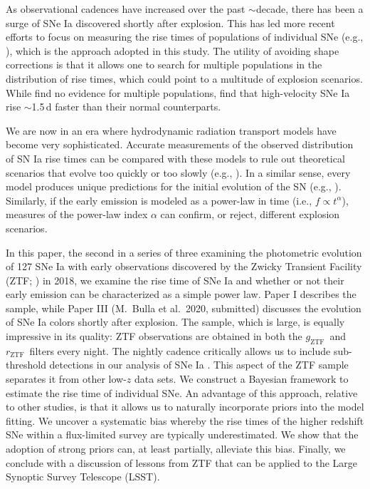 \documentclass[twocolumn]{./aastex63}
\newcommand{\rztf}{$r_\mathrm{ZTF}$}
\newcommand{\gztf}{$g_\mathrm{ZTF}$}
\begin{document}
As observational cadences have increased over the past $\sim$decade, there has
been a surge of SNe Ia discovered shortly after explosion. This has led more
recent efforts to focus on measuring the rise times of populations of
individual SNe (e.g., \citealt{Firth15,Zheng17a,Papadogiannakis19}), which is
the approach adopted in this study. The utility of avoiding shape corrections
is that it allows one to search for multiple populations in the distribution
of rise times, which could point to a multitude of explosion scenarios. While
\citet{Papadogiannakis19} find no evidence for multiple populations,
\citet{Ganeshalingam10} find that high-velocity SNe Ia rise $\sim$1.5\,d
faster than their normal counterparts.

We are now in an era where hydrodynamic radiation transport models have become
very sophisticated. Accurate measurements of the observed distribution of SN
Ia rise times can be compared with these models to rule out theoretical
scenarios that evolve too quickly or too slowly (e.g., \citealt{Magee18}). In
a similar sense, every model produces unique predictions for the initial
evolution of the SN (e.g., \citealt{Dessart14,Noebauer17,Polin19,Magee19}).
Similarly, if the early emission is modeled as a power-law in time (i.e., $f
\propto t^\alpha$), measures of the power-law index $\alpha$ can confirm, or
reject, different explosion scenarios.

In this paper, the second in a series of three examining the photometric
evolution of 127 SNe Ia with early observations discovered by the Zwicky
Transient Facility (ZTF; \citealt{Bellm19,Graham19}) in 2018, we examine the
rise time of SNe Ia and whether or not their early emission can be
characterized as a simple power law. Paper I \citep{Yao19} describes the
sample, while Paper III (M.~Bulla et al.\ 2020, submitted) discusses the
evolution of SNe Ia colors shortly after explosion. The sample, which is
large, is equally impressive in its quality: ZTF observations are obtained in
both the \gztf\ and \rztf\ filters every night. The nightly cadence critically
allows us to include sub-threshold detections in our analysis of SNe Ia
\citep{Yao19}. This aspect of the ZTF sample separates it from other low-$z$
data sets. We construct a Bayesian framework to estimate the rise time of
individual SNe. An advantage of this approach, relative to other studies, is
that it allows us to naturally incorporate priors into the model fitting. We
uncover a systematic bias whereby the rise times of the higher redshift SNe
within a flux-limited survey are typically underestimated. We show that the
adoption of strong priors can, at least partially, alleviate this bias.
Finally, we conclude with a discussion of lessons from ZTF that can be applied
to the Large Synoptic Survey Telescope (LSST).
\end{document}
